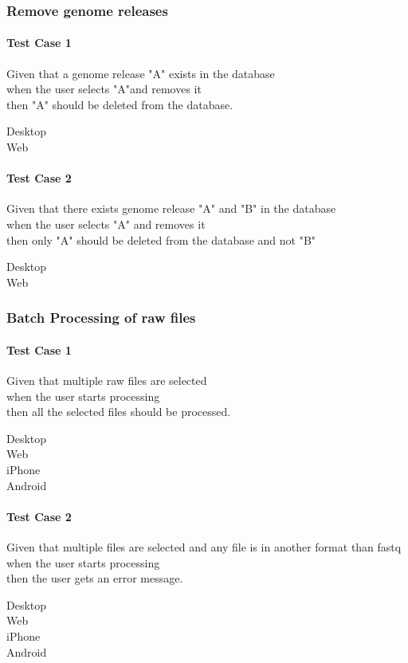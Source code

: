 \subsubsection{Remove genome releases}
\paragraph*{Test Case 1}
Given that a genome release "A" exists in the database \\ when the user selects "A"and removes it \\ then "A" should be deleted from the database.
\begin{description}
 \item[Desktop] \cmark
 \item[Web] \cmark
\end{description}
\paragraph*{Test Case 2}
Given that there exists genome release "A" and "B" in the database \\ when the user selects "A" and removes it \\ then only "A" should be deleted from the database and not "B"
\begin{description}
 \item[Desktop] \cmark
 \item[Web] \cmark
\end{description}


\subsubsection{Batch Processing of raw files}
\paragraph*{Test Case 1}
Given that multiple raw files are selected \\ when the user starts processing \\ then all the selected files should be processed.
\begin{description}
 \item[Desktop]
 \item[Web]
 \item[iPhone] \cmark
 \item[Android]
\end{description}
\paragraph*{Test Case 2}
Given that multiple files are selected and any file is in another format than fastq \\ when the user starts processing \\ then the user gets an error message.
\begin{description}
 \item[Desktop]
 \item[Web]
 \item[iPhone] \cmark
 \item[Android]
\end{description}
